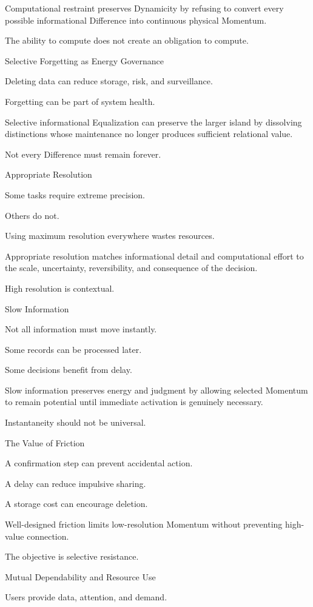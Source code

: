 Computational restraint preserves Dynamicity by refusing to convert every possible informational Difference into continuous physical Momentum.

The ability to compute does not create an obligation to compute.

Selective Forgetting as Energy Governance

Deleting data can reduce storage, risk, and surveillance.

Forgetting can be part of system health.

Selective informational Equalization can preserve the larger island by dissolving distinctions whose maintenance no longer produces sufficient relational value.

Not every Difference must remain forever.

Appropriate Resolution

Some tasks require extreme precision.

Others do not.

Using maximum resolution everywhere wastes resources.

Appropriate resolution matches informational detail and computational effort to the scale, uncertainty, reversibility, and consequence of the decision.

High resolution is contextual.

Slow Information

Not all information must move instantly.

Some records can be processed later.

Some decisions benefit from delay.

Slow information preserves energy and judgment by allowing selected Momentum to remain potential until immediate activation is genuinely necessary.

Instantaneity should not be universal.

The Value of Friction

A confirmation step can prevent accidental action.

A delay can reduce impulsive sharing.

A storage cost can encourage deletion.

Well-designed friction limits low-resolution Momentum without preventing high-value connection.

The objective is selective resistance.

Mutual Dependability and Resource Use

Users provide data, attention, and demand.

